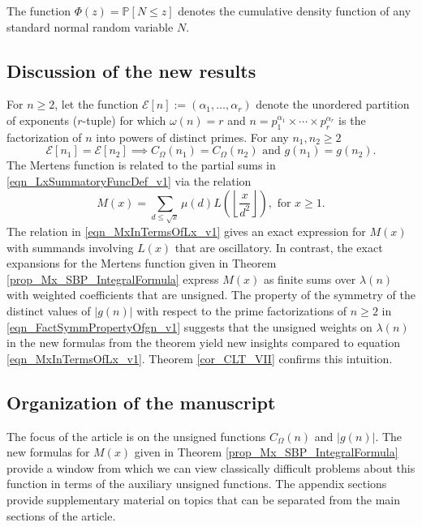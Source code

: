 \documentclass[11pt,reqno,a4letter]{article}
\newcommand{\hlocalref}[1]{\hyperref[#1]{\ref{#1}}}
\numberwithin{equation}{section}
\numberwithin{figure}{section}
\numberwithin{table}{section}
\newcommand{\Floor}[2]{\ensuremath{\left\lfloor \frac{#1}{#2} \right\rfloor}}
\theoremstyle{plain}
\numberwithin{theorem}{section}
\theoremstyle{definition}
\begin{document}
The function $\Phi(z) = \mathbb{P}[N \leq z]$ denotes the cumulative density function of 
any standard normal random variable $N$. 

\subsection{Discussion of the new results}

For $n \geq 2$, let the function 
$\mathcal{E}[n] := (\alpha_1, \ldots, \alpha_r)$ denote the unordered 
partition of exponents ($r$-tuple) for which $\omega(n) = r$ and 
$n = p_1^{\alpha_1} \times \cdots \times p_r^{\alpha_r}$ is the factorization of 
$n$ into powers of distinct primes. 
For any $n_1,n_2 \geq 2$ 
\begin{equation}
\label{eqn_FactSymmPropertyOfgn_v1} 
\mathcal{E}[n_1] = \mathcal{E}[n_2] \implies C_{\Omega}(n_1) = C_{\Omega}(n_2) \text{ and } 
	g(n_1) = g(n_2). 
\end{equation}
The Mertens function is related to the partial sums in 
\eqref{eqn_LxSummatoryFuncDef_v1} 
via the relation \cite{HUMPHRIES-JNT-2013,LEHMAN-1960} 
\begin{equation}
\label{eqn_MxInTermsOfLx_v1} 
M(x) = \sum_{d \leq \sqrt{x}} \mu(d) L\left(\Floor{x}{d^2}\right), \text{ for } x \geq 1.
\end{equation}
The relation in \eqref{eqn_MxInTermsOfLx_v1} 
gives an exact expression for $M(x)$ with summands involving $L(x)$ that are oscillatory. 
In contrast, the exact expansions for the Mertens function given in 
Theorem \hlocalref{prop_Mx_SBP_IntegralFormula} 
express $M(x)$ as finite sums over $\lambda(n)$ with weighted coefficients that are unsigned. 
The property of the symmetry of the distinct values of $|g(n)|$ with respect to the 
prime factorizations of $n \geq 2$ in \eqref{eqn_FactSymmPropertyOfgn_v1} 
suggests that the unsigned weights on $\lambda(n)$ in 
the new formulas from the theorem yield new insights compared to 
equation \eqref{eqn_MxInTermsOfLx_v1}.
Theorem \hlocalref{cor_CLT_VII} confirms this intuition.

\subsection{Organization of the manuscript}

The focus of the article is on the unsigned functions 
$C_{\Omega}(n)$ and $|g(n)|$. 
The new formulas for $M(x)$ given in 
Theorem \hlocalref{prop_Mx_SBP_IntegralFormula} 
provide a window from which we can view classically  
difficult problems about this function in terms of the 
auxiliary unsigned functions. 
The appendix sections provide 
supplementary material on topics that can be separated from the 
main sections of the article. 
\end{document}
